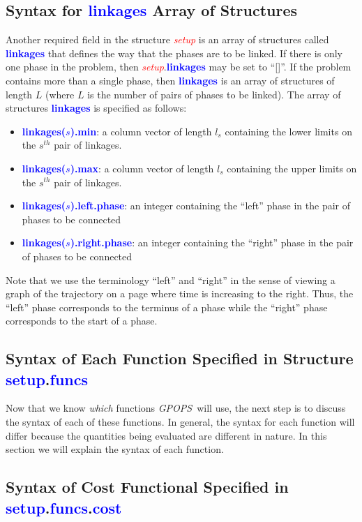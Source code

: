 \documentclass[10pt]{article}
\newcommand{\gpops}{{\em GPOPS}~}
\newcommand{\bfblue}[1]{\textcolor{blue}{\bf #1}}
\newcommand{\slred}[1]{\textcolor{red}{\sl #1}}
\begin{document}
\subsection{Syntax for \bfblue{linkages} Array of Structures \label{sect:linkages}}

Another required field in the structure \slred{setup} is an array of
structures called \bfblue{linkages} that defines the way that the
phases are to be linked.  If there is only one phase in the problem, then
\slred{setup}.\bfblue{linkages} may be set to ``[]''.  If the problem
contains more than a single phase, then \bfblue{linkages} is an array
of structures of length $L$ (where $L$ is the number of pairs of phases
to be linked).  The array of structures \bfblue{linkages} is specified
as follows:
\begin{itemize}
\item \bfblue{linkages($s$).min}: a column vector of length $l_s$
  containing the lower limits on the $s^{th}$ pair of linkages.
\item \bfblue{linkages($s$).max}: a column vector of length $l_s$
  containing the upper limits on the $s^{th}$ pair of linkages.
\item \bfblue{linkages($s$).left.phase}: an integer containing the
  ``left'' phase in the pair of phases to be connected
\item \bfblue{linkages($s$).right.phase}: an integer containing the
  ``right'' phase in the pair of phases to be connected
\end{itemize}
Note that we use the terminology ``left'' and ``right'' in the sense
of viewing a graph of the trajectory on a page where time is
increasing to the right.  Thus, the ``left'' phase corresponds to the
terminus of a phase while the ``right'' phase corresponds to the
start of a phase.

\subsection{Syntax of Each Function Specified in Structure \bfblue{setup}.\bfblue{funcs}}

Now that we know {\em which} functions \gpops will use, the next step is to
discuss the syntax of each of these functions.  In general, the syntax for
each function will differ because the quantities being evaluated are different
in nature.  In this section we will explain the syntax of each function.

\subsection{Syntax of Cost Functional Specified in \bfblue{setup}.\bfblue{funcs}.\bfblue{cost}}\label{sect:costSyntax}
\end{document}
